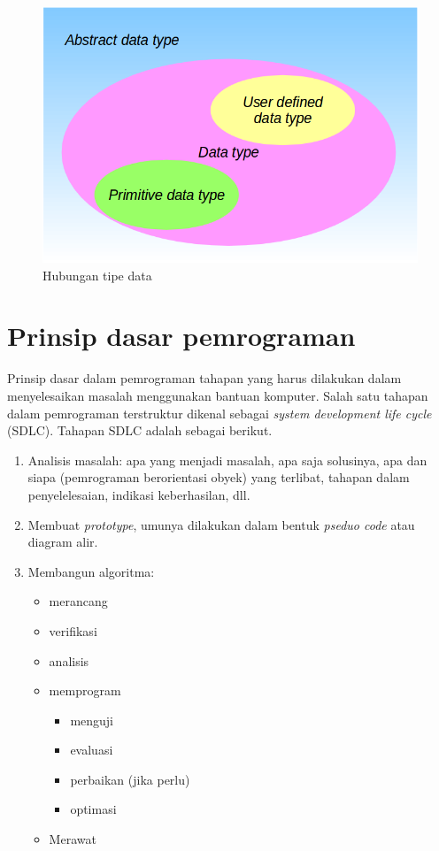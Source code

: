\begin{figure}[H]
\centering
\includegraphics[scale=.5]{pics/datatype.png}
\caption{Hubungan tipe data}
\label{fig:datatype}
\end{figure} 

\section{Prinsip dasar pemrograman}
\label{sec:prinsip}
Prinsip dasar dalam pemrograman tahapan yang harus dilakukan dalam menyelesaikan masalah menggunakan bantuan komputer. Salah satu tahapan dalam pemrograman terstruktur dikenal sebagai \textit{system development life cycle} (SDLC). Tahapan SDLC adalah sebagai berikut.
\begin{enumerate}
\item Analisis masalah: apa yang menjadi masalah, apa saja solusinya, apa dan siapa (pemrograman berorientasi obyek) yang terlibat, tahapan dalam penyelelesaian, indikasi keberhasilan, dll.
\item Membuat \textit{prototype}, umunya dilakukan dalam bentuk \textit{pseduo code} atau diagram alir.
\item Membangun algoritma:
\begin{itemize}
\item merancang \label{sec:rancangan}
\item verifikasi
\item analisis
\item memprogram
\begin{itemize}
\item menguji
\item evaluasi
\item perbaikan (jika perlu)
\item optimasi
\end{itemize}
\item Merawat
\end{itemize}
\end{enumerate}

